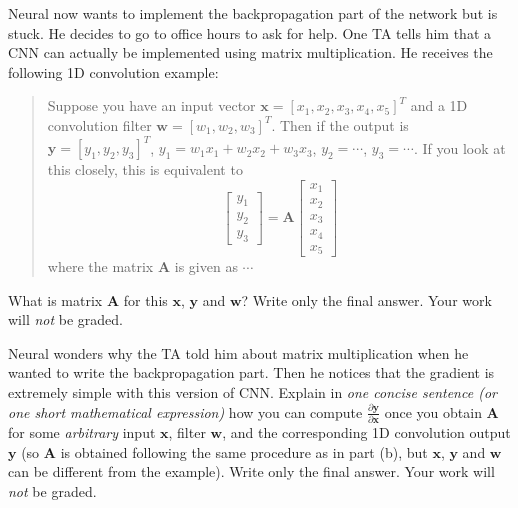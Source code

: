 \documentclass[11pt,addpoints,answers]{exam}
\newcommand{\wv}{\mathbf{w}}
\newcommand{\xv}{\mathbf{x}}
\newcommand{\yv}{\mathbf{y}}
\newcommand{\Av}{\mathbf{A}}
\begin{document}
\begin{questions}
\begin{parts}
\begin{subparts}
\subpart[2] Neural now wants to implement the backpropagation part of the network but is stuck. He decides to go to office hours to ask for help. One TA tells him that a CNN can actually be implemented using matrix multiplication. He receives the following 1D convolution example:
\begin{quote}
    Suppose you have an input vector $\xv = [x_1, x_2, x_3, x_4, x_5]^T$ and a 1D convolution filter $\wv = [w_1, w_2, w_3]^T$. Then if the output is $\yv = [y_1, y_2, y_3]^T$, $y_1 = w_1 x_1 + w_2 x_2 + w_3 x_3$, $y_2 = \cdots$, $y_3 = \cdots$. If you look at this closely, this is equivalent to
    \[
    \begin{bmatrix} y_1 \\ y_2 \\ y_3 \end{bmatrix} = \Av \begin{bmatrix} x_1 \\ x_2 \\ x_3 \\ x_4 \\ x_5 \end{bmatrix}
    \]
    where the matrix $\Av$ is given as $\cdots$
\end{quote}
What is matrix $\Av$ for this $\xv$, $\yv$ and $\wv$? Write only the final answer. Your work will \textit{not} be graded. \\
    \begin{your_solution}[height=4cm]
    
    
    \end{your_solution}

\vspace{5mm}

\subpart[2] Neural wonders why the TA told him about matrix multiplication when he wanted to write the backpropagation part. Then he notices that the gradient is extremely simple with this version of CNN. Explain in \textit{one concise sentence (or one short mathematical expression)} how you can compute $\frac{\partial \yv}{\partial \xv}$ once you obtain $\Av$ for some \textit{arbitrary} input $\xv$, filter $\wv$, and the corresponding 1D convolution output $\yv$ (so $\Av$ is obtained following the same procedure as in part (b), but $\xv$, $\yv$ and $\wv$ can be different from the example). Write only the final answer. Your work will \textit{not} be graded. \\
    \begin{your_solution}[height=2cm, width=4cm]
    

\end{your_solution}
\end{subparts}
\end{parts}
\end{questions}
\end{document}
